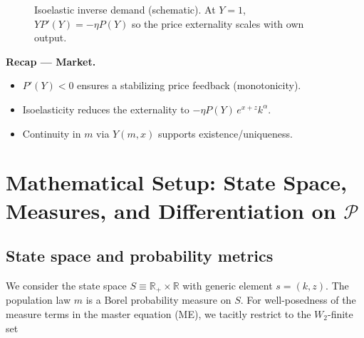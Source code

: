 \documentclass[11pt,letterpaper,oneside]{article}
\numberwithin{equation}{section}
\newcommand{\R}{\mathbb{R}}
\newcommand{\1}{\mathbf{1}}
\begin{document}
\begin{figure}[ht]
\centering
{}
\caption{Isoelastic inverse demand (schematic). At $Y=1$, $Y P'(Y)=-\eta P(Y)$ so the price externality scales with own output.}
\end{figure}

\begin{tcolorbox}[didacticstyle]
\textbf{Recap — Market.}
\begin{itemize}[leftmargin=1.15em,itemsep=0.2em]
  \item $P'(Y)<0$ ensures a stabilizing price feedback (monotonicity).
  \item Isoelasticity reduces the externality to $-\eta P(Y)\,e^{x+z}k^\alpha$.
  \item Continuity in $m$ via $Y(m,x)$ supports existence/uniqueness.
\end{itemize}
\end{tcolorbox}

\section{Mathematical Setup: State Space, Measures, and Differentiation on \texorpdfstring{$\mathcal P$}{P}}

\subsection{State space and probability metrics}
We consider the state space $S\equiv \R_+\times\R$ with generic element $s=(k,z)$. The population law $m$ is a Borel probability measure on $S$. For well-posedness of the measure terms in the master equation (ME), we tacitly restrict to the $W_2$-finite set
\end{document}
